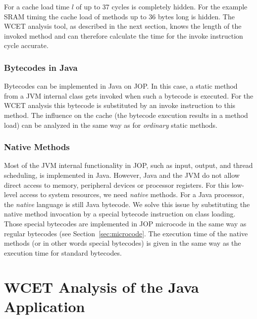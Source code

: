 For  a cache load time $l$ of up to 37 cycles is
completely hidden. For the example SRAM timing the cache load of
methods up to 36 bytes long is hidden. The WCET analysis tool, as
described in the next section, knows the length of the invoked method
and can therefore calculate the time for the invoke instruction cycle
accurate.

\subsubsection{Bytecodes in Java}

Bytecodes can be implemented in Java on JOP. In this case, a static
method from a JVM internal class gets invoked when such a bytecode is
executed. For the WCET analysis this bytecode is substituted by an
invoke instruction to this method. The influence on the cache (the
bytecode execution results in a method load) can be analyzed in the
same way as for \emph{ordinary} static methods.


\subsubsection{Native Methods}

Most of the JVM internal functionality in JOP, such as input, output,
and thread scheduling, is implemented in Java. However, Java and the
JVM do not allow direct access to memory, peripheral devices or
processor registers. For this low-level access to system resources,
we need \emph{native} methods. For a Java processor, the
\emph{native} language is still Java bytecode. We solve this issue by
substituting the native method invocation by a special bytecode
instruction on class loading. Those special bytecodes are implemented
in JOP microcode in the same way as regular bytecodes (see
Section~\ref{sec:microcode}. The execution time of the native methods
(or in other words special bytecodes) is given in the same way as the
execution time for standard bytecodes.

\section{WCET Analysis of the Java Application}
\label{sec:wcet:app} 

